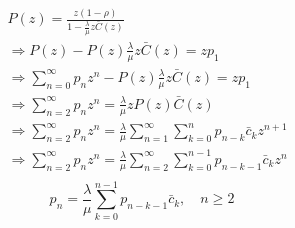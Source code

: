 \documentclass{article}
\begin{document}
\begin{align*}
&P(z) = \frac{z(1-\rho)}{1-\frac{\lambda}{\mu} z \bar{C}(z)}\\
&\Rightarrow P(z) - P(z) \frac{\lambda}{\mu} z \bar{C}(z) = zp_1\\
&\Rightarrow\sum_{n=0}^{\infty} p_n z^n - P(z) \frac{\lambda}{\mu} z \bar{C}(z) = zp_1\\
&\Rightarrow\sum_{n=2}^{\infty} p_n z^n = \frac{\lambda}{\mu} z P(z) \bar{C}(z)\\
&\Rightarrow\sum_{n=2}^{\infty} p_n z^n = \frac{\lambda}{\mu} \sum_{n=1}^{\infty} \sum_{k=0}^{n} p_{n-k} \bar{c}_k z^{n+1}\\
&\Rightarrow\sum_{n=2}^{\infty} p_n z^n = \frac{\lambda}{\mu} \sum_{n=2}^{\infty} \sum_{k=0}^{n-1} p_{n-k-1} \bar{c}_k z^n\\
\end{align*}
\begin{equation*}
\boxed{p_n = \frac{\lambda}{\mu} \sum_{k=0}^{n-1} p_{n-k-1} \bar{c}_k , \quad n \geq 2}
\end{equation*}
\end{document}
